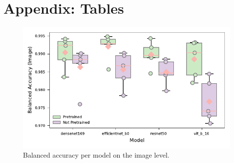 

\section{Appendix: Tables}
\label{apendix_tables}



    \begin{figure}[ht]
    \centering
    \includegraphics{figures/bal_acc_img.pdf}
    \caption{Balanced accuracy per model on the image level.}
    \label{fig:bal_acc_img}
    \end{figure}